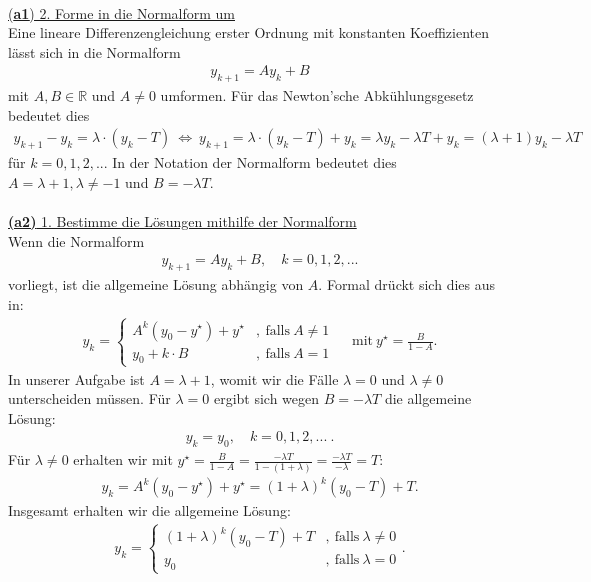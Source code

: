 \\
\underline{(\textbf{a1}) 2. Forme in die Normalform um}\\
Eine lineare Differenzengleichung erster Ordnung mit konstanten Koeffizienten lässt sich in die Normalform
\begin{align*}
	y_{k+1} = A y_k + B
\end{align*}
mit $ A, B \in \mathbb{R} $ und $ A \neq  0$ umformen. 
Für das Newton'sche Abkühlungsgesetz bedeutet dies
\begin{align*}
	y_{k+1} - y_k = \lambda \cdot (y_k - T)
	\ \Leftrightarrow \
	y_{k+1} = \lambda \cdot (y_k - T) + y_k
	= \lambda y_k - \lambda T + y_k
	=(\lambda + 1) y_k - \lambda T
\end{align*}
für $ k = 0,1,2,.. $.
In der Notation der Normalform bedeutet dies $ A = \lambda + 1 , \lambda \neq -1 $ und $ B = - \lambda T $.\\
\\
\underline{\textbf{(a2)} 1. Bestimme die Lösungen mithilfe der Normalform}\\
Wenn die Normalform
\begin{align*}
	y_{k+1} = A y_k + B, \quad k = 0,1,2,...
\end{align*}
vorliegt, ist die allgemeine Lösung abhängig von $ A $. Formal drückt sich dies aus in:
\begin{align*}
	y_k = 
	\begin{cases}
		A^k(y_0 - y^\star) 	+y^\star&, \ \text{falls} \ A \neq 1\\
		y_0 + k \cdot B      &, \ \text{falls} \ A = 1 
	\end{cases}
	\quad
	\ \text{mit} \
	y^\star = \frac{B}{1-A}.
\end{align*}
In unserer Aufgabe ist $ A = \lambda + 1  $, womit wir die Fälle $ \lambda = 0  $ und $ \lambda \neq 0  $ unterscheiden müssen.
Für $ \lambda = 0 $ ergibt sich wegen $ B = -\lambda T $ die allgemeine Lösung:
\begin{align*}
	y_k = y_0 ,\quad k= 0,1,2,... \ .
\end{align*}
Für $ \lambda \neq 0 $ erhalten wir mit $ y^\star =
\frac{B}{1- A} = \frac{-\lambda T}{1 - (1+ \lambda)} = \frac{-\lambda T}{-\lambda}
= T $:
\begin{align*}
	y_k = A^k(y_0 - y^\star) 	+y^\star
	=
	(1+ \lambda)^k (y_0 - T) + T.
\end{align*}
Insgesamt erhalten wir die allgemeine Lösung:
\begin{align*}
		y_k = 
	\begin{cases}
		(1+ \lambda)^k (y_0 - T) + T&, \ \text{falls} \ \lambda \neq 0\\
		y_0 &, \ \text{falls} \ \lambda = 0
	\end{cases}.
\end{align*}
